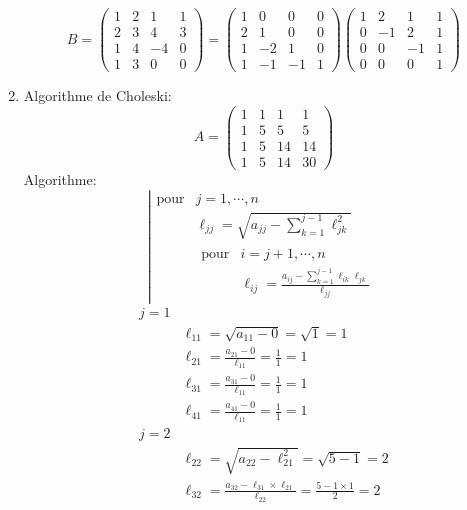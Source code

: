 \documentclass[a4paper]{article}
\begin{document}
\begin{enumerate}
\[B=\left(\begin{array}{cccc}
1& 2& 1& 1\\
2& 3& 4& 3\\
1& 4& -4& 0\\
1& 3& 0& 0
\end{array}\right)=\left(\begin{array}{cccc}
1&0&0&0\\
2&1&0&0\\
1&-2&1&0\\
1&-1&-1&1
\end{array}\right) \left(\begin{array}{cccc}
1&2&1&1\\
0&-1&2&1\\
0&0&-1&1\\
0&0&0&1
\end{array}\right)
\]
%
\item Algorithme de Choleski:
\[A=\left(\begin{array}{cccc}
1&1&1&1\\
1&5&5&5\\
1&5&14&14\\
1&5&14&30
\end{array}\right)
\]
Algorithme:
\[\left|\begin{array}{cl}
\mbox{pour} & j=1,\cdots ,n\\
             & \ell_{jj}=\sqrt{a_{jj}-\sum_{k=1}^{j-1}\ell_{jk}^2}\\
             &\begin{array}{cl}
\mbox{pour} & i=j+1,\cdots ,n\\
             & \ell_{ij}=\frac{a_{ij}-\sum_{k=1}^{j-1}\ell_{ik}\ell_{jk}}{\ell_{jj}}
\end{array}
\end{array}\right.
\]
\[\begin{array}{ll}
j=1& \\
   & \ell_{11}=\sqrt{a_{11}-0}=\sqrt{1}=1\\
   & \ell_{21}=\frac{a_{21}-0}{\ell_{11}}=\frac 11=1\\
   & \ell_{31}=\frac{a_{31}-0}{\ell_{11}}=\frac 11=1\\
   & \ell_{41}=\frac{a_{41}-0}{\ell_{11}}=\frac 11=1 \\
j=2& \\
   & \ell_{22}=\sqrt{a_{22}-\ell_{21}^2}=\sqrt{5-1}=2\\
   & \ell_{32}=\frac{a_{32}-\ell_{31}\times \ell_{21}}{\ell_{22}}=\frac {5-1\times 1}2=2\\

\end{array}\]
\end{enumerate}
\end{document}
